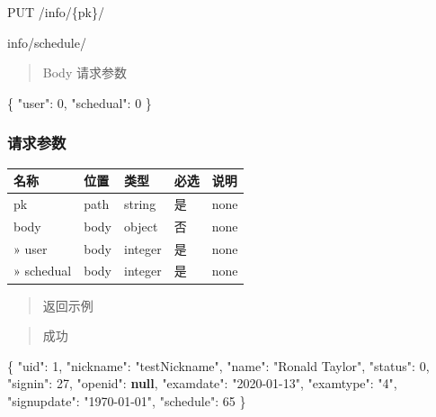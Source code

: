 \documentclass[
]{article}
\newenvironment{Shaded}{}{}
\newcommand{\DataTypeTok}[1]{\textcolor[rgb]{0.56,0.13,0.00}{#1}}
\newcommand{\DecValTok}[1]{\textcolor[rgb]{0.25,0.63,0.44}{#1}}
\newcommand{\FunctionTok}[1]{\textcolor[rgb]{0.02,0.16,0.49}{#1}}
\newcommand{\KeywordTok}[1]{\textcolor[rgb]{0.00,0.44,0.13}{\textbf{#1}}}
\newcommand{\StringTok}[1]{\textcolor[rgb]{0.25,0.44,0.63}{#1}}
\begin{document}
PUT /info/\{pk\}/

info/schedule/

\begin{quote}
Body 请求参数
\end{quote}

\begin{Shaded}
\begin{Highlighting}[]
\FunctionTok{\{}
  \DataTypeTok{"user"}\FunctionTok{:} \DecValTok{0}\FunctionTok{,}
  \DataTypeTok{"schedual"}\FunctionTok{:} \DecValTok{0}
\FunctionTok{\}}
\end{Highlighting}
\end{Shaded}

\hypertarget{ux8bf7ux6c42ux53c2ux6570-26}{%
\subsubsection{请求参数}\label{ux8bf7ux6c42ux53c2ux6570-26}}

\begin{longtable}[]{@{}lllll@{}}
\toprule
名称 & 位置 & 类型 & 必选 & 说明 \\
\midrule
\endhead
pk & path & string & 是 & none \\
body & body & object & 否 & none \\
» user & body & integer & 是 & none \\
» schedual & body & integer & 是 & none \\
\bottomrule
\end{longtable}

\begin{quote}
返回示例
\end{quote}

\begin{quote}
成功
\end{quote}

\begin{Shaded}
\begin{Highlighting}[]
\FunctionTok{\{}
  \DataTypeTok{"uid"}\FunctionTok{:} \DecValTok{1}\FunctionTok{,}
  \DataTypeTok{"nickname"}\FunctionTok{:} \StringTok{"testNickname"}\FunctionTok{,}
  \DataTypeTok{"name"}\FunctionTok{:} \StringTok{"Ronald Taylor"}\FunctionTok{,}
  \DataTypeTok{"status"}\FunctionTok{:} \DecValTok{0}\FunctionTok{,}
  \DataTypeTok{"signin"}\FunctionTok{:} \DecValTok{27}\FunctionTok{,}
  \DataTypeTok{"openid"}\FunctionTok{:} \KeywordTok{null}\FunctionTok{,}
  \DataTypeTok{"examdate"}\FunctionTok{:} \StringTok{"2020{-}01{-}13"}\FunctionTok{,}
  \DataTypeTok{"examtype"}\FunctionTok{:} \StringTok{"4"}\FunctionTok{,}
  \DataTypeTok{"signupdate"}\FunctionTok{:} \StringTok{"1970{-}01{-}01"}\FunctionTok{,}
  \DataTypeTok{"schedule"}\FunctionTok{:} \DecValTok{65}
\FunctionTok{\}}
\end{Highlighting}
\end{Shaded}
\end{document}
